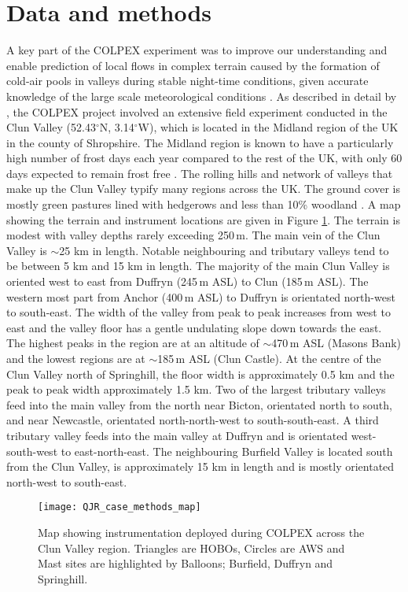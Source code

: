 \documentclass[times]{qjrms4}
\begin{document}
\section{Data and methods}
\label{methods}
A key part of the COLPEX experiment was to improve our understanding and enable prediction of local flows in complex terrain caused by the formation of cold-air pools in valleys during stable night-time conditions, given accurate knowledge of the large scale meteorological conditions \citep{price2010COLPEX}. As described in detail by \citet{price2010COLPEX}, the COLPEX project involved an extensive field experiment conducted in the Clun Valley (52.43$^\circ$N, 3.14$^\circ$W), which is located in the Midland region of the UK in the county of Shropshire. The Midland region is known to have a particularly high number of frost days each year compared to the rest of the UK, with only 60 days expected to remain frost free \citep{KingandGiles1997}. The rolling hills and network of valleys that make up the Clun Valley typify many regions across the UK. The ground cover is mostly green pastures lined with hedgerows and less than 10\% woodland \citep{price2010COLPEX}. A map showing the terrain and instrument locations are given in Figure \ref{fig:MAP}. The terrain is modest with valley depths rarely exceeding 250$\,\mbox{m}$. The main vein of the Clun Valley is $\sim$25 km in length. Notable neighbouring and tributary valleys tend to be between 5 km and 15 km in length. The majority of the main Clun Valley is oriented west to east from Duffryn (245$\,\mbox{m}$ ASL) to Clun (185$\,\mbox{m}$ ASL). The western most part from Anchor (400$\,\mbox{m}$ ASL) to Duffryn is orientated north-west to south-east. The width of the valley from peak to peak increases from west to east and the valley floor has a gentle undulating slope down towards the east. The highest peaks in the region are at an altitude of $\sim$470$\,\mbox{m}$ ASL (Masons Bank) and the lowest regions are at $\sim$185$\,\mbox{m}$ ASL (Clun Castle). At the centre of the Clun Valley north of Springhill, the floor width is approximately 0.5 km and the peak to peak width approximately 1.5 km. Two of the largest tributary valleys feed into the main valley from the north near Bicton, orientated north to south, and near Newcastle, orientated north-north-west to south-south-east. A third tributary valley feeds into the main valley at Duffryn and is orientated west-south-west to east-north-east. The neighbouring Burfield Valley is located south from the Clun Valley, is approximately 15 km in length and is mostly orientated north-west to south-east.
%
	\begin{figure}
	\centering
	\texttt{[image: QJR\_case\_methods\_map]}
	\caption{Map showing instrumentation deployed during COLPEX across the Clun Valley region. Triangles are HOBOs, Circles are AWS and Mast sites are highlighted by Balloons; Burfield, Duffryn and Springhill.}
	\label{fig:MAP}
	\end{figure}
\end{document}
